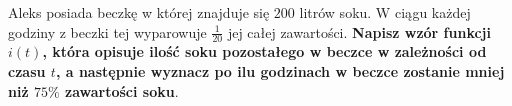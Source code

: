 Aleks posiada beczkę w której znajduje się $200$ litrów soku. W ciągu każdej godziny z beczki tej wyparowuje $\frac{1}{20}$ jej całej zawartości. \textbf{Napisz wzór funkcji $i(t)$, która opisuje ilość soku pozostałego w beczce w zależności od czasu $t$, a następnie wyznacz po ilu godzinach w beczce zostanie mniej niż $75\%$ zawartości soku}.